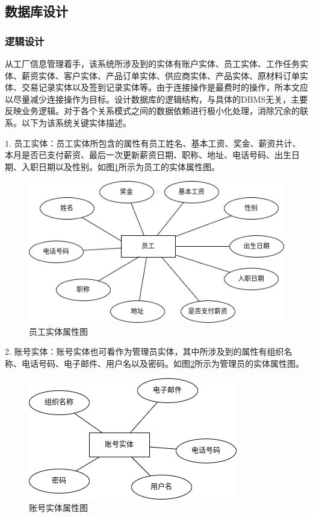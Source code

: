 \subsection{数据库设计}

\subsubsection{逻辑设计}

从工厂信息管理着手，该系统所涉及到的实体有账户实体、员工实体、工作任务实体、薪资实体、客户实体、产品订单实体、供应商实体、产品实体、原材料订单实体、交易记录实体以及签到记录实体等。由于连接操作是最费时的操作，所本文应以尽量减少连接操作为目标。设计数据库的逻辑结构，与具体的DBMS无关，主要反映业务逻辑。对于各个关系模式之间的数据依赖进行极小化处理，消除冗余的联系。以下为该系统关键实体描述。

1. 员工实体：员工实体所包含的属性有员工姓名、基本工资、奖金、薪资共计、本月是否已支付薪资、最后一次更新薪资日期、职称、地址、电话号码、出生日期、入职日期以及性别。如图\ref{fig:4emplyerf}所示为员工的实体属性图。

\begin{figure}[H]
    \centering
    \includegraphics[width=.65\textwidth]{figures/4emplyerf.png}
    \caption{员工实体属性图}
    \label{fig:4emplyerf}
\end{figure}

2. 账号实体：账号实体也可看作为管理员实体，其中所涉及到的属性有组织名称、电话号码、电子邮件、用户名以及密码。如图\ref{fig:4acterf}所示为管理员的实体属性图。

\begin{figure}[H]
    \centering
    \includegraphics[width=.45\textwidth]{figures/4acterf.png}
    \caption{账号实体属性图}
    \label{fig:4acterf}
\end{figure}

